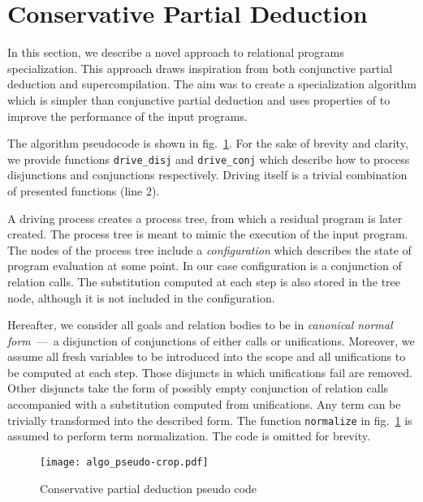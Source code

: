 \newcommand{\code}[1]{\texttt{#1}}

\section{Conservative Partial Deduction}

In this section, we describe a novel approach to relational programs specialization.
This approach draws inspiration from both conjunctive partial deduction and supercompilation.
The aim was to create a specialization algorithm which is simpler than conjunctive partial deduction and uses properties of \mk to improve the performance of the input programs.

The algorithm pseudocode is shown in fig.~\ref{fig:ncpd-pseudo}.
For the sake of brevity and clarity, we provide functions \code{drive\_disj} and \code{drive\_conj} which describe how to process disjunctions and conjunctions respectively.
Driving itself is a trivial combination of presented functions (line 2).

A driving process creates a process tree, from which a residual program is later created.
The process tree is meant to mimic the execution of the input program.
The nodes of the process tree include a \emph{configuration} which describes the state of program evaluation at some point.
In our case configuration is a conjunction of relation calls.
The substitution computed at each step is also stored in the tree node, although it is not included in the configuration.

Hereafter, we consider all goals and relation bodies to be in \emph{canonical normal form}~---~a disjunction of conjunctions of either calls or unifications.
Moreover, we assume all fresh variables to be introduced into the scope and all unifications to be computed at each step.
Those disjuncts in which unifications fail are removed.
Other disjuncts take the form of possibly empty conjunction of relation calls accompanied with a substitution computed from unifications.
Any \mk term can be trivially transformed into the described form.
The function \code{normalize} in fig.~\ref{fig:ncpd-pseudo}  is assumed to perform term normalization.
The code is omitted for brevity.

\begin{figure}[!t]
  \centering
  \texttt{[image: algo\_pseudo-crop.pdf]}
  \caption{Conservative partial deduction pseudo code}
  \label{fig:ncpd-pseudo}
\end{figure}

